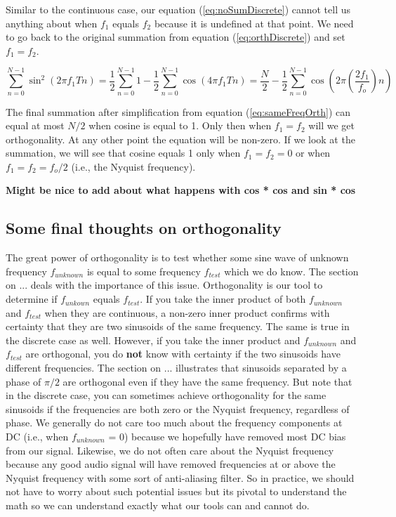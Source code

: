 	Similar to the continuous case, our equation (\ref{eq:noSumDiscrete}) cannot tell us anything about 
	when $f_1$ equals
	$f_2$ because it is undefined at that point.  We need to go back to the original summation from equation 
	(\ref{eq:orthDiscrete}) and set $f_1 = f_2$.  
	
	\begin{equation}
	\label{eq:sameFreqOrth}
	\sum_{n = 0}^{N-1}\sin^2(2\pi f_1Tn) =
	 \frac{1}{2}\sum_{n = 0}^{N-1}1 - \frac{1}{2}\sum_{n = 0}^{N-1}\cos(4\pi f_1Tn) = 
	 \frac{N}{2} - \frac{1}{2}\sum_{n = 0}^{N-1}\cos(2\pi (\frac{2f_1}{f_o})n)
	\end{equation}
	
	The final summation after simplification from equation (\ref{eq:sameFreqOrth}) can equal at most $N/2$ when
	cosine is equal to 1.  Only then when $f_1 = f_2$ will we get orthogonality.  At any other point the equation
	will be non-zero.  If we look at the summation, we will see that cosine equals 1 only when $f_1 = f_2 = 0$ or 
	when $f_1 = f_2 = f_o/2$ (i.e., the Nyquist frequency).
	
	\textbf{Might be nice to add about what happens with cos * cos and sin * cos}
	
	\subsection*{Some final thoughts on orthogonality}
		The great power of orthogonality is to test whether some sine wave of unknown frequency $f_{unknown}$
	is equal to some frequency $f_{test}$ which we do know.  The section on ... deals with the importance of this 
	issue.  Orthogonality is our tool to determine if $f_{unkown}$ equals $f_{test}$.  If you take the inner product
	of both $f_{unknown}$ and $f_{test}$ when they are continuous, a non-zero inner product confirms with
	certainty that they are two sinusoids of the same frequency.  The same is true in the discrete case as well.
	However, if you take the inner product and $f_{unknown}$ and $f_{test}$ are orthogonal, you do \textbf{not}
	know with certainty if the two sinusoids have different frequencies.  The section on ... illustrates that sinusoids
	separated by a phase of $\pi/2$ are orthogonal even if they have the same frequency.  But note that in the
	discrete case, you can sometimes achieve orthogonality for the same sinusoids if the frequencies are both zero 
	or the Nyquist frequency, regardless of phase.  We generally do not care too much about the frequency 
	components at DC (i.e., when $f_{unknown}$ = 0) because we hopefully have removed most DC bias from
	our signal.  Likewise, we do not often care about the Nyquist frequency because any good audio signal will
	have removed frequencies at or above the Nyquist frequency with some sort of anti-aliasing filter.  So
	in practice, we should not have to worry about such potential issues but its pivotal to understand the math
	so we can understand exactly what our tools can and cannot do.
